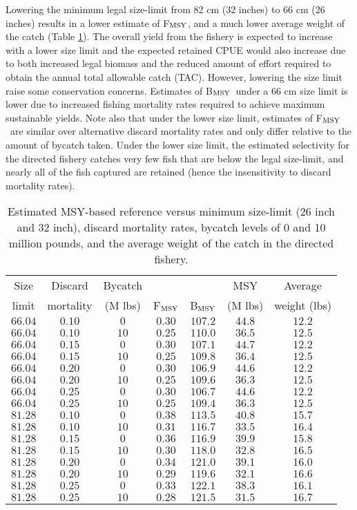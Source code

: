 \documentclass[12pt,leqno]{article}
\newcommand{\fmsy}{F$_{\textnormal{MSY}}$}
\newcommand{\bmsy}{B$_{\textnormal{MSY}}$}
\begin{document}
Lowering the minimum legal size-limit from 82 cm (32 inches) to 66 cm (26 inches) results in a lower estimate of \fmsy, and a much lower average weight of the catch (Table \ref{tab:MSY_reference_points}). The overall yield from the fishery is expected to increase with a lower size limit and the expected retained CPUE would also increase due to both increased legal biomass and the reduced amount of effort required to obtain the annual total allowable catch (TAC).  However, lowering the size limit raise some conservation concerns.  Estimates of \bmsy\ under a 66 cm size limit is lower due to increased fishing mortality rates required to achieve maximum sustainable yields.  Note also that under the lower size limit, estimates of \fmsy\ are similar over alternative discard mortality rates and only differ relative to the amount of bycatch taken.  Under the lower size limit, the estimated selectivity for the directed fishery catches very few fish that are below the legal size-limit, and nearly all of the fish captured are retained (hence the insensitivity to discard mortality rates).

\begin{table}[!tbp]
\caption{Estimated MSY-based reference versus minimum size-limit (26 inch and 32 inch), discard mortality rates, bycatch levels of 0 and 10 million pounds, and the average weight of the catch in the directed fishery. }\label{tab:MSY_reference_points}
\begin{center}
\begin{tabular}{ccccccc}
\hline\hline
\multicolumn{1}{c}{Size}&
\multicolumn{1}{c}{Discard}&
\multicolumn{1}{c}{Bycatch}&
\multicolumn{1}{c}{}&
\multicolumn{1}{c}{}&
\multicolumn{1}{c}{MSY}&
\multicolumn{1}{c}{Average}
\tabularnewline
\multicolumn{1}{c}{limit}&
\multicolumn{1}{c}{mortality}&
\multicolumn{1}{c}{(M lbs)}&
\multicolumn{1}{c}{\fmsy}&
\multicolumn{1}{c}{\bmsy}&
\multicolumn{1}{c}{(M lbs)}&
\multicolumn{1}{c}{weight (lbs)}
\tabularnewline
\hline
$66.04$&$0.10$&$ 0$&$0.30$&$107.2$&$44.8$&$12.2$\tabularnewline
$66.04$&$0.10$&$10$&$0.25$&$110.0$&$36.5$&$12.5$\tabularnewline
$66.04$&$0.15$&$ 0$&$0.30$&$107.1$&$44.7$&$12.2$\tabularnewline
$66.04$&$0.15$&$10$&$0.25$&$109.8$&$36.4$&$12.5$\tabularnewline
$66.04$&$0.20$&$ 0$&$0.30$&$106.9$&$44.6$&$12.2$\tabularnewline
$66.04$&$0.20$&$10$&$0.25$&$109.6$&$36.3$&$12.5$\tabularnewline
$66.04$&$0.25$&$ 0$&$0.30$&$106.7$&$44.6$&$12.2$\tabularnewline
$66.04$&$0.25$&$10$&$0.25$&$109.4$&$36.3$&$12.5$\tabularnewline
\hline
$81.28$&$0.10$&$ 0$&$0.38$&$113.5$&$40.8$&$15.7$\tabularnewline
$81.28$&$0.10$&$10$&$0.31$&$116.7$&$33.5$&$16.4$\tabularnewline
$81.28$&$0.15$&$ 0$&$0.36$&$116.9$&$39.9$&$15.8$\tabularnewline
$81.28$&$0.15$&$10$&$0.30$&$118.0$&$32.8$&$16.5$\tabularnewline
$81.28$&$0.20$&$ 0$&$0.34$&$121.0$&$39.1$&$16.0$\tabularnewline
$81.28$&$0.20$&$10$&$0.29$&$119.6$&$32.1$&$16.6$\tabularnewline
$81.28$&$0.25$&$ 0$&$0.33$&$122.1$&$38.3$&$16.1$\tabularnewline
$81.28$&$0.25$&$10$&$0.28$&$121.5$&$31.5$&$16.7$\tabularnewline
\hline
\end{tabular}
\end{center}
\end{table}
\end{document}
